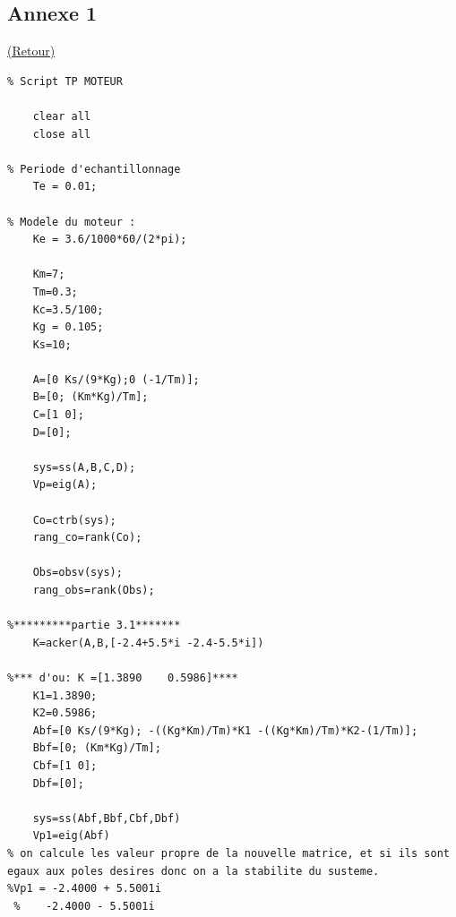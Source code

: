 \documentclass[12pt, a4paper, openany]{report}
\begin{document}
\begin{appendices}
\chapter*{Annexe 1}

\hyperref[annexe1]{(Retour)}\label{section1.1}
	
	
\begin{lstlisting}
% Script TP MOTEUR

	clear all
	close all

% Periode d'echantillonnage
	Te = 0.01;

% Modele du moteur :
	Ke = 3.6/1000*60/(2*pi);

	Km=7;
	Tm=0.3;
	Kc=3.5/100;
	Kg = 0.105;
	Ks=10;

	A=[0 Ks/(9*Kg);0 (-1/Tm)];
	B=[0; (Km*Kg)/Tm];
	C=[1 0];
	D=[0];

	sys=ss(A,B,C,D);
	Vp=eig(A);

	Co=ctrb(sys);
	rang_co=rank(Co);

	Obs=obsv(sys);
	rang_obs=rank(Obs);

%*********partie 3.1*******
	K=acker(A,B,[-2.4+5.5*i -2.4-5.5*i])

%*** d'ou: K =[1.3890    0.5986]****
	K1=1.3890;
	K2=0.5986;
	Abf=[0 Ks/(9*Kg); -((Kg*Km)/Tm)*K1 -((Kg*Km)/Tm)*K2-(1/Tm)];
	Bbf=[0; (Km*Kg)/Tm];
	Cbf=[1 0];
	Dbf=[0];

	sys=ss(Abf,Bbf,Cbf,Dbf)
	Vp1=eig(Abf)
% on calcule les valeur propre de la nouvelle matrice, et si ils sont egaux aux poles desires donc on a la stabilite du susteme. 
%Vp1 = -2.4000 + 5.5001i
 %    -2.4000 - 5.5001i
		
			    			
	\end{lstlisting}
				
\end{appendices}





%
%
\end{document}
